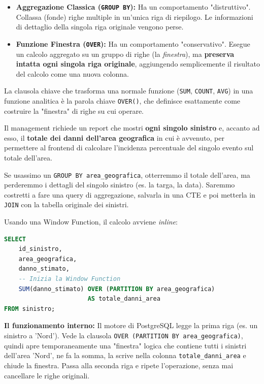 \begin{itemize}
    \item \textbf{Aggregazione Classica (\texttt{GROUP BY}):} Ha un comportamento "distruttivo". Collassa (fonde) righe multiple in un'unica riga di riepilogo. Le informazioni di dettaglio della singola riga originale vengono perse.
    \item \textbf{Funzione Finestra (\texttt{OVER}):} Ha un comportamento "conservativo". Esegue un calcolo aggregato su un gruppo di righe (la \textit{finestra}), ma \textbf{preserva intatta ogni singola riga originale}, aggiungendo semplicemente il risultato del calcolo come una nuova colonna.
\end{itemize}

La clausola chiave che trasforma una normale funzione (\texttt{SUM}, \texttt{COUNT}, \texttt{AVG}) in una funzione analitica è la parola chiave \texttt{OVER()}, che definisce esattamente come costruire la "finestra" di righe su cui operare.

\begin{example}
Il management richiede un report che mostri \textbf{ogni singolo sinistro} e, accanto ad esso, il \textbf{totale dei danni dell'area geografica} in cui è avvenuto, per permettere al frontend di calcolare l'incidenza percentuale del singolo evento sul totale dell'area.

Se usassimo un \texttt{GROUP BY area\_geografica}, otterremmo il totale dell'area, ma perderemmo i dettagli del singolo sinistro (es. la targa, la data). Saremmo costretti a fare una query di aggregazione, salvarla in una CTE e poi metterla in \texttt{JOIN} con la tabella originale dei sinistri.

Usando una Window Function, il calcolo avviene \textit{inline}:
\begin{lstlisting}[language=SQL, basicstyle=\ttfamily\small, keywordstyle=\color{blue}\bfseries]
SELECT 
    id_sinistro,
    area_geografica,
    danno_stimato,
    -- Inizia la Window Function
    SUM(danno_stimato) OVER (PARTITION BY area_geografica)
                       AS totale_danni_area
FROM sinistro;
\end{lstlisting}

\textbf{Il funzionamento interno:} Il motore di PostgreSQL legge la prima riga (es. un sinistro a 'Nord'). Vede la clausola \texttt{OVER (PARTITION BY area\_geografica)}, quindi apre temporaneamente una "finestra" logica che contiene tutti i sinistri dell'area 'Nord', ne fa la somma, la scrive nella colonna \texttt{totale\_danni\_area} e chiude la finestra. Passa alla seconda riga e ripete l'operazione, senza mai cancellare le righe originali.
\end{example}

